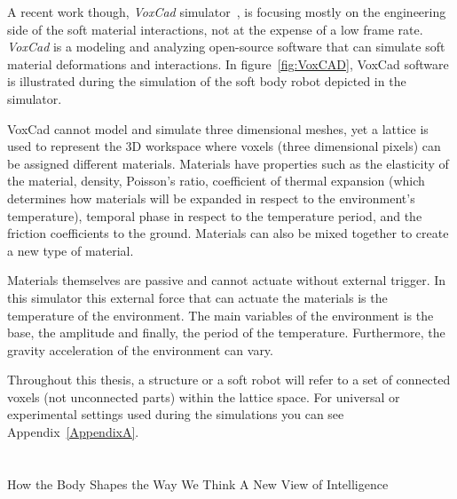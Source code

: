 A recent work though, \emph{VoxCad} simulator~\cite{hiller2012dynamic}, is focusing mostly on the engineering side of the soft material interactions, not at the expense of a low frame rate. \emph{VoxCad} is a modeling and analyzing open-source software that can simulate soft material deformations and interactions. In figure~\ref{fig:VoxCAD}, VoxCad software is illustrated during the simulation of the soft body robot depicted in the simulator.

VoxCad cannot model and simulate three dimensional meshes, yet a lattice is used to represent the 3D workspace where voxels (three dimensional pixels) can be assigned different materials. Materials have properties such as the elasticity of the material, density, Poisson's ratio, coefficient of thermal expansion (which determines how materials will be expanded in respect to the environment's temperature), temporal phase in respect to the temperature period, and the friction coefficients to the ground. Materials can also be mixed together to create a new type of material.

Materials themselves are passive and cannot actuate without external trigger. In this simulator this external force that can actuate the materials is the temperature of the environment. The main variables of the environment is the base, the amplitude and finally, the period of the temperature. Furthermore, the gravity acceleration of the environment can vary.

Throughout this thesis, a structure or a soft robot will refer to a set of connected voxels (not unconnected parts) within the lattice space. For universal or experimental settings used during the simulations you can see Appendix~\ref{AppendixA}.





\section*{}
\cite{stanley2003taxonomy}
\cite{nelson2009fitness}
\cite{meyer1998evolutionary}
How the Body Shapes the Way We Think A New View of Intelligence~\cite{pfeifer2007body}
\cite{albu2008soft}
\cite{woolley2011deleterious}
\cite{lewis1992genetic}
\cite{lapeyre2011maturational}
\cite{oudeyer2013intrinsically}
\cite{gauci:gecco07}
